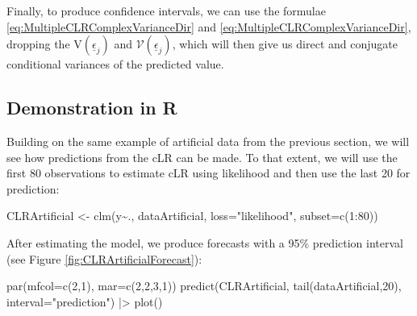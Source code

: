 \documentclass[
]{book}
\newenvironment{Shaded}{\begin{snugshade}}{\end{snugshade}}
\newcommand{\AttributeTok}[1]{\textcolor[rgb]{0.77,0.63,0.00}{#1}}
\newcommand{\DecValTok}[1]{\textcolor[rgb]{0.00,0.00,0.81}{#1}}
\newcommand{\FunctionTok}[1]{\textcolor[rgb]{0.00,0.00,0.00}{#1}}
\newcommand{\NormalTok}[1]{#1}
\newcommand{\OtherTok}[1]{\textcolor[rgb]{0.56,0.35,0.01}{#1}}
\newcommand{\SpecialCharTok}[1]{\textcolor[rgb]{0.00,0.00,0.00}{#1}}
\newcommand{\StringTok}[1]{\textcolor[rgb]{0.31,0.60,0.02}{#1}}
\begin{document}
Finally, to produce confidence intervals, we can use the formulae \eqref{eq:MultipleCLRComplexVarianceDir} and \eqref{eq:MultipleCLRComplexVarianceDir}, dropping the \(\mathrm{V}\left(\underline{\epsilon}_j\right)\) and \(\mathcal{V}\left(\underline{\epsilon}_j\right)\), which will then give us direct and conjugate conditional variances of the predicted value.

\hypertarget{demonstration-in-r-1}{%
\subsection{Demonstration in R}\label{demonstration-in-r-1}}

Building on the same example of artificial data from the previous section, we will see how predictions from the cLR can be made. To that extent, we will use the first 80 observations to estimate cLR using likelihood and then use the last 20 for prediction:

\begin{Shaded}
\begin{Highlighting}[]
\NormalTok{CLRArtificial }\OtherTok{\textless{}{-}} \FunctionTok{clm}\NormalTok{(y}\SpecialCharTok{\textasciitilde{}}\NormalTok{., dataArtificial,}
                     \AttributeTok{loss=}\StringTok{"likelihood"}\NormalTok{, }\AttributeTok{subset=}\FunctionTok{c}\NormalTok{(}\DecValTok{1}\SpecialCharTok{:}\DecValTok{80}\NormalTok{))}
\end{Highlighting}
\end{Shaded}

After estimating the model, we produce forecasts with a 95\% prediction interval (see Figure \ref{fig:CLRArtificialForecast}):

\begin{Shaded}
\begin{Highlighting}[]
\FunctionTok{par}\NormalTok{(}\AttributeTok{mfcol=}\FunctionTok{c}\NormalTok{(}\DecValTok{2}\NormalTok{,}\DecValTok{1}\NormalTok{), }\AttributeTok{mar=}\FunctionTok{c}\NormalTok{(}\DecValTok{2}\NormalTok{,}\DecValTok{2}\NormalTok{,}\DecValTok{3}\NormalTok{,}\DecValTok{1}\NormalTok{))}
\FunctionTok{predict}\NormalTok{(CLRArtificial, }\FunctionTok{tail}\NormalTok{(dataArtificial,}\DecValTok{20}\NormalTok{),}
        \AttributeTok{interval=}\StringTok{"prediction"}\NormalTok{) }\SpecialCharTok{|\textgreater{}}
    \FunctionTok{plot}\NormalTok{()}
\end{Highlighting}
\end{Shaded}
\end{document}
